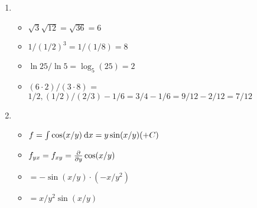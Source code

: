 \item
	\begin{enumerate}
	
	\item
		\begin{itemize}
			\item $\sqrt{3} \sqrt{12} = \sqrt{36} = 6$
			\item $1/(1/2)^3 = 1/(1/8) = 8$ 
			\item $\ln 25 / \ln 5 = \log_5(25) = 2$
			\item $(6\cdot 2)/(3\cdot 8)$ = $1/2, (1/2)/(2/3) - 1/6 = 3/4 - 1/6 = 9/12 - 2/12 = 7 / 12$
		\end{itemize}
	
	\item
		\begin{itemize}
			\item $f = \int \cos(x/y) \:\mathrm{d}{x} = y \sin(x/y) (+C)$
			\item $f_{yx} = f_{xy} = \frac{\partial }{\partial y} \cos(x/y) $
			\item $ = -\sin(x/y) \cdot (-x/y^2) $
			\item $ = x/y^2 \sin(x/y)$
		\end{itemize}
		
	\end{enumerate}
